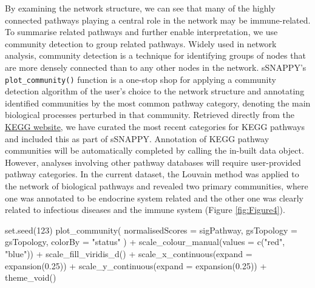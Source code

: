 \documentclass[9pt,a4paper,]{extarticle}
\newenvironment{Shaded}{\begin{snugshade}}{\end{snugshade}}
\newcommand{\AttributeTok}[1]{\textcolor[rgb]{0.77,0.63,0.00}{#1}}
\newcommand{\DecValTok}[1]{\textcolor[rgb]{0.00,0.00,0.81}{#1}}
\newcommand{\FloatTok}[1]{\textcolor[rgb]{0.00,0.00,0.81}{#1}}
\newcommand{\FunctionTok}[1]{\textcolor[rgb]{0.00,0.00,0.00}{#1}}
\newcommand{\NormalTok}[1]{#1}
\newcommand{\SpecialCharTok}[1]{\textcolor[rgb]{0.00,0.00,0.00}{#1}}
\newcommand{\StringTok}[1]{\textcolor[rgb]{0.31,0.60,0.02}{#1}}
\begin{document}
By examining the network structure, we can see that many of the highly connected pathways playing a central role in the network may be immune-related.
To summarise related pathways and further enable interpretation, we use community detection to group related pathways.
Widely used in network analysis, community detection is a technique for identifying groups of nodes that are more densely connected than to any other nodes in the network\citep{Newman2004}.
sSNAPPY's \texttt{plot\_community()} function is a one-stop shop for applying a community detection algorithm of the user's choice to the network structure and annotating identified communities by the most common pathway category, denoting the main biological processes perturbed in that community.
Retrieved directly from the \href{https://www.genome.jp/kegg/pathway.html}{KEGG website}, we have curated the most recent categories for KEGG pathways and included this as part of sSNAPPY.
Annotation of KEGG pathway communities will be automatically completed by calling the in-built data object.
However, analyses involving other pathway databases will require user-provided pathway categories.
In the current dataset, the Louvain method was applied to the network of biological pathways and revealed two primary communities, where one was annotated to be endocrine system related and the other one was clearly related to infectious diseases and the immune system (Figure \ref{fig:Figure4}).

\begin{Shaded}
\begin{Highlighting}[]
\FunctionTok{set.seed}\NormalTok{(}\DecValTok{123}\NormalTok{)}
\FunctionTok{plot\_community}\NormalTok{(}
  \AttributeTok{normalisedScores =}\NormalTok{ sigPathway,}
  \AttributeTok{gsTopology =}\NormalTok{ gsTopology, }
  \AttributeTok{colorBy =} \StringTok{"status"}
\NormalTok{) }\SpecialCharTok{+}
  \FunctionTok{scale\_colour\_manual}\NormalTok{(}\AttributeTok{values =} \FunctionTok{c}\NormalTok{(}\StringTok{"red"}\NormalTok{, }\StringTok{"blue"}\NormalTok{)) }\SpecialCharTok{+}
  \FunctionTok{scale\_fill\_viridis\_d}\NormalTok{() }\SpecialCharTok{+}
  \FunctionTok{scale\_x\_continuous}\NormalTok{(}\AttributeTok{expand =} \FunctionTok{expansion}\NormalTok{(}\FloatTok{0.25}\NormalTok{)) }\SpecialCharTok{+}
  \FunctionTok{scale\_y\_continuous}\NormalTok{(}\AttributeTok{expand =} \FunctionTok{expansion}\NormalTok{(}\FloatTok{0.25}\NormalTok{)) }\SpecialCharTok{+}
  \FunctionTok{theme\_void}\NormalTok{() }
\end{Highlighting}
\end{Shaded}
\end{document}
